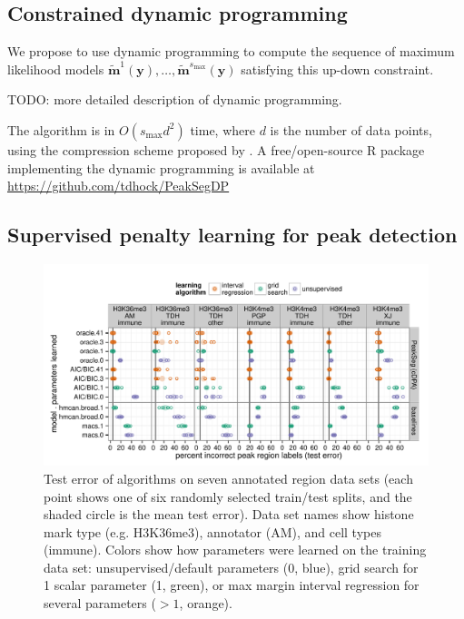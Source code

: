 \documentclass{article}
\begin{document}
\subsection{Constrained dynamic programming}
\label{sec:constrained-dp}

We propose to use dynamic programming to compute the sequence of
maximum likelihood models $\mathbf{\tilde m}^1(\mathbf y), \dots,
\mathbf{\tilde m}^{s_{\text{max}}}(\mathbf y)$ satisfying this up-down
constraint.

TODO: more detailed description of dynamic programming.

The algorithm is in $O(s_{\text{max}} d^2)$ time, where $d$ is the
number of data points, using the compression scheme proposed by
\citet{Segmentor}. A free/open-source R package implementing the
dynamic
programming is available at\\
\url{https://github.com/tdhock/PeakSegDP}

\subsection{Supervised penalty learning for peak detection}
\label{sec:supervised}


\begin{figure}[b!]
  \centering
  \includegraphics[width=\textwidth]{figure-dp-peaks-regression-dots}
  \vskip -0.5cm
  \caption{Test error of algorithms on seven annotated region data
    sets (each point shows one of six randomly selected train/test
    splits, and the shaded circle is the mean test error). Data set
    names show histone mark type (e.g. H3K36me3), annotator (AM), and
    cell types (immune). Colors show how parameters were learned on
    the training data set: unsupervised/default parameters (0, blue),
    grid search for 1 scalar parameter (1, green), or max margin interval
    regression for several parameters ($>1$, orange).}
  \label{fig:test-error}
\end{figure}
\end{document}
